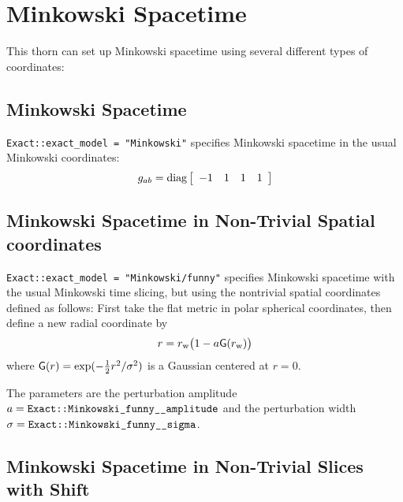 
\section{Minkowski Spacetime}

This thorn can set up Minkowski spacetime using several different
types of coordinates:


\subsection{Minkowski Spacetime}

\verb|Exact::exact_model = "Minkowski"| specifies Minkowski spacetime
in the usual Minkowski coordinates:
\begin{equation}
g_{ab} = \diag \left[
	 \begin{array}{cccc}
	 -1	& 1	& 1	& 1	%
	 \end{array}
	 \right]
\end{equation}


\subsection{Minkowski Spacetime in Non-Trivial Spatial coordinates}

\verb|Exact::exact_model = "Minkowski/funny"| specifies Minkowski spacetime
with the usual Minkowski time slicing, but using the nontrivial spatial
coordinates defined as follows:  First take the flat metric in polar
spherical coordinates, then define a new radial coordinate by
\begin{equation}
r = r_{\text{w}} \big(1 - a {\sf G}(r_{\text{w}})\big)
\end{equation}
where 
${\sf G}(r) = \exp(-{\textstyle \frac{1}{2}} r^2/\sigma^2)$ is a Gaussian centered at $r=0$.

The parameters are the perturbation amplitude
$a = \verb|Exact::Minkowski_funny__amplitude|$
and the perturbation width $\sigma = \verb|Exact::Minkowski_funny__sigma|$.


\subsection{Minkowski Spacetime in Non-Trivial Slices with Shift}

